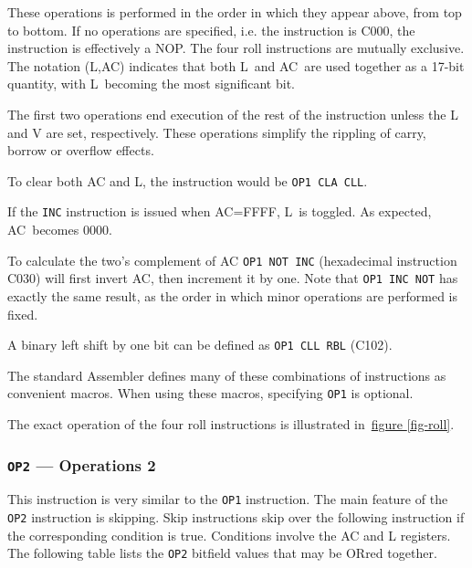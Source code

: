 \documentclass[11pt,a4paper,twocolumns]{article}
\newcommand{\npcf}[2][section]{\hyperref[#2]{#1 \ref*{#2}}}
\newcommand{\npfcf}[1]{\npcf[figure]{#1}}
\newcommand\hex[1]{\textsf{#1}}
\newcommand\register[1]{\textsf{#1}}
\newcommand\A{\register{AC}}
\newcommand\Lreg{\register{L}}
\newcommand\Vreg{\register{V}}
\begin{document}
These operations is performed in the order in which they appear above,
from top to bottom. If no operations are specified, i.e. the
instruction is \hex{C000}, the instruction is effectively a NOP. The
four roll instructions are mutually exclusive. The notation (\Lreg,\A)
indicates that both \Lreg\ and \A\ are used together as a 17-bit
quantity, with \Lreg\ becoming the most significant bit.

The first two operations end execution of the rest of the instruction
unless the \Lreg{} and \Vreg{} are set, respectively. These operations
simplify the rippling of carry, borrow or overflow effects.

To clear both \A{} and \Lreg, the instruction would be {\tt OP1 CLA CLL}.

If the {\tt INC} instruction is issued when \A=\hex{FFFF}, \Lreg\ is
toggled. As expected, \A\ becomes \hex{0000}.

To calculate the two's complement of \A{} {\tt OP1 NOT INC} (hexadecimal
instruction \hex{C030}) will first invert \A{}, then increment it by
one. Note that {\tt OP1 INC NOT} has exactly the same result, as the
order in which minor operations are performed is fixed.

A binary left shift by one bit can be defined as {\tt OP1 CLL RBL}
(\hex{C102}).

The standard Assembler defines many of these combinations of 
instructions as
convenient macros. When using these macros, specifying {\tt OP1} is
optional.

The exact operation of the four roll instructions is illustrated
in~\npfcf{fig-roll}.

\subsubsection{{\tt OP2} — Operations 2}
\label{sec-op2}

This instruction is very similar to the {\tt OP1} instruction. The
main feature of the {\tt OP2} instruction is skipping. Skip
instructions skip over the following instruction if the corresponding
condition is true. Conditions involve the \A{} and \Lreg{} registers. The
following table lists the {\tt OP2} bitfield values that may be ORred
together.
\end{document}
